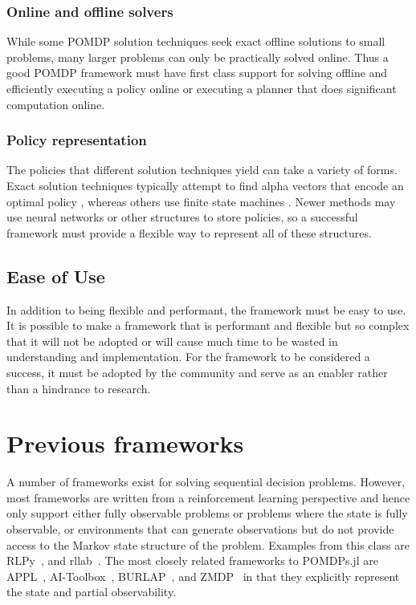 \subsubsection{Online and offline solvers}

While some POMDP solution techniques seek exact offline solutions to small problems, many larger problems can only be practically solved online.
Thus a good POMDP framework must have first class support for solving offline and efficiently executing a policy online or executing a planner that does significant computation online.

\subsubsection{Policy representation}

The policies that different solution techniques yield can take a variety of forms.
Exact solution techniques typically attempt to find alpha vectors that encode an optimal policy \cite{kaelbling1998planning,kurniawati2008sarsop}, whereas others use finite state machines \cite{bai2010mcvi}.
Newer methods may use neural networks \cite{karkus2017qmdp} or other structures to store policies, so a successful framework must provide a flexible way to represent all of these structures.

\subsection{Ease of Use}

In addition to being flexible and performant, the framework must be easy to use.
It is possible to make a framework that is performant and flexible but so complex that it will not be adopted or will cause much time to be wasted in understanding and implementation.
For the framework to be considered a success, it must be adopted by the community and serve as an enabler rather than a hindrance to research.

\section{Previous frameworks}

A number of frameworks exist for solving sequential decision problems.
However, most frameworks are written from a reinforcement learning perspective and hence only support either fully observable problems or problems where the state is fully observable, or environments that can generate observations but do not provide access to the Markov state structure of the problem.
Examples from this class are RLPy~\cite{geramifard2015rlpy}, and rllab~\cite{duan2016benchmarking}.
The most closely related frameworks to POMDPs.jl are APPL~\citep{appl}, AI-Toolbox~\citep{aitoolbox}, BURLAP~\cite{diuk2008object}, and ZMDP~\citep{zmdp} in that they explicitly represent the state and partial observability.

